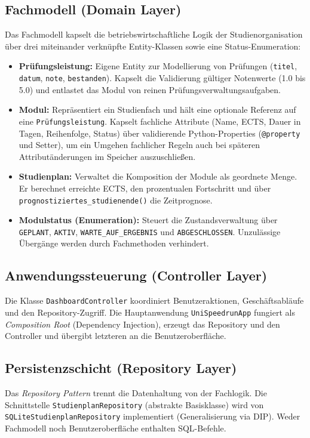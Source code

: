 \documentclass[11pt,a4paper]{article}
\begin{document}
\subsection{Fachmodell (Domain Layer)}
Das Fachmodell kapselt die betriebswirtschaftliche Logik der Studienorganisation über drei miteinander verknüpfte Entity-Klassen sowie eine Status-Enumeration:
\begin{itemize}[leftmargin=*,noitemsep,topsep=2pt]
    \item \textbf{Prüfungsleistung:} Eigene Entity zur Modellierung von Prüfungen (\texttt{titel}, \texttt{datum}, \texttt{note}, \texttt{bestanden}). Kapselt die Validierung gültiger Notenwerte (1.0 bis 5.0) und entlastet das Modul von reinen Prüfungsverwaltungsaufgaben.
    \item \textbf{Modul:} Repräsentiert ein Studienfach und hält eine optionale Referenz auf eine \texttt{Prüfungsleistung}. Kapselt fachliche Attribute (Name, ECTS, Dauer in Tagen, Reihenfolge, Status) über validierende Python-Properties (\texttt{@property} und Setter), um ein Umgehen fachlicher Regeln auch bei späteren Attributänderungen im Speicher auszuschließen.
    \item \textbf{Studienplan:} Verwaltet die Komposition der Module als geordnete Menge. Er berechnet erreichte ECTS, den prozentualen Fortschritt und über \texttt{prognostiziertes\_studienende()} die Zeitprognose.
    \item \textbf{Modulstatus (Enumeration):} Steuert die Zustandsverwaltung über \texttt{GEPLANT}, \texttt{AKTIV}, \texttt{WARTE\_AUF\_ERGEBNIS} und \texttt{ABGESCHLOSSEN}. Unzulässige Übergänge werden durch Fachmethoden verhindert.
\end{itemize}

\subsection{Anwendungssteuerung (Controller Layer)}
Die Klasse \texttt{DashboardController} koordiniert Benutzeraktionen, Geschäftsabläufe und den Repository-Zugriff. Die Hauptanwendung \texttt{UniSpeedrunApp} fungiert als \textit{Composition Root} (Dependency Injection), erzeugt das Repository und den Controller und übergibt letzteren an die Benutzeroberfläche.

\subsection{Persistenzschicht (Repository Layer)}
Das \textit{Repository Pattern} trennt die Datenhaltung von der Fachlogik. Die Schnittstelle \texttt{StudienplanRepository} (abstrakte Basisklasse) wird von \texttt{SQLiteStudienplanRepository} implementiert (Generalisierung via DIP). Weder Fachmodell noch Benutzeroberfläche enthalten SQL-Befehle.
\end{document}
